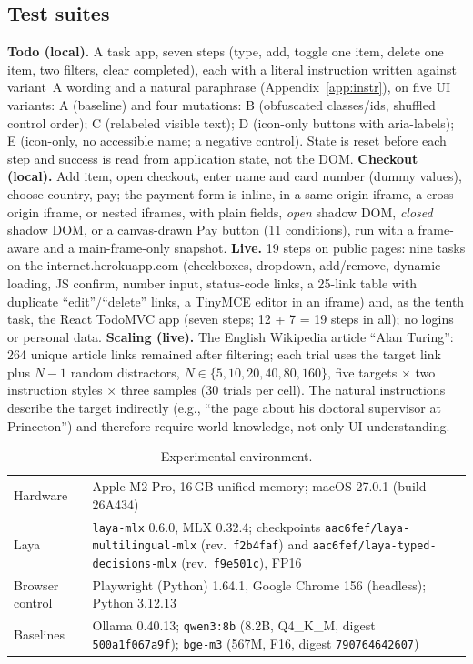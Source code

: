 \documentclass[11pt,a4paper]{article}
\begin{document}
\subsection{Test suites}\label{sec:suites}
\textbf{Todo (local).} A task app, seven steps (type, add, toggle one item, delete one item, two filters, clear completed), each with a literal instruction written against variant~A wording and a natural paraphrase (Appendix~\ref{app:instr}), on five UI variants: A (baseline) and four mutations: B (obfuscated classes/ids, shuffled control order); C (relabeled visible text); D (icon-only buttons with aria-labels); E (icon-only, no accessible name; a negative control). State is reset before each step and success is read from application state, not the DOM. \textbf{Checkout (local).} Add item, open checkout, enter name and card number (dummy values), choose country, pay; the payment form is inline, in a same-origin iframe, a cross-origin iframe, or nested iframes, with plain fields, \emph{open} shadow DOM, \emph{closed} shadow DOM, or a canvas-drawn Pay button (11 conditions), run with a frame-aware and a main-frame-only snapshot. \textbf{Live.} 19 steps on public pages: nine tasks on the-internet.herokuapp.com \cite{theinternet} (checkboxes, dropdown, add/remove, dynamic loading, JS confirm, number input, status-code links, a 25-link table with duplicate ``edit''/``delete'' links, a TinyMCE editor in an iframe) and, as the tenth task, the React TodoMVC app \cite{todomvc} (seven steps; 12 + 7 = 19 steps in all); no logins or personal data. \textbf{Scaling (live).} The English Wikipedia article ``Alan Turing'': 264 unique article links remained after filtering; each trial uses the target link plus $N{-}1$ random distractors, $N\in\{5,10,20,40,80,160\}$, five targets $\times$ two instruction styles $\times$ three samples (30 trials per cell). The natural instructions describe the target indirectly (e.g., ``the page about his doctoral supervisor at Princeton'') and therefore require world knowledge, not only UI understanding.

\begin{table}[t]\centering\small
\begin{tabular}{@{}lp{12.2cm}@{}}\toprule
Hardware & Apple M2 Pro, 16\,GB unified memory; macOS 27.0.1 (build 26A434)\\
Laya & \texttt{laya-mlx} 0.6.0, MLX 0.32.4; checkpoints \texttt{aac6fef/laya-multilingual-mlx} (rev.\ \texttt{f2b4faf}) and \texttt{aac6fef/laya-typed-decisions-mlx} (rev.\ \texttt{f9e501c}), FP16\\
Browser control & Playwright (Python) 1.64.1, Google Chrome 156 (headless); Python 3.12.13\\
Baselines & Ollama 0.40.13; \texttt{qwen3:8b} (8.2B, Q4\_K\_M, digest \texttt{500a1f067a9f}); \texttt{bge-m3} (567M, F16, digest \texttt{790764642607})\\
\bottomrule\end{tabular}
\caption{Experimental environment.}\label{tab:env}
\end{table}
\end{document}
